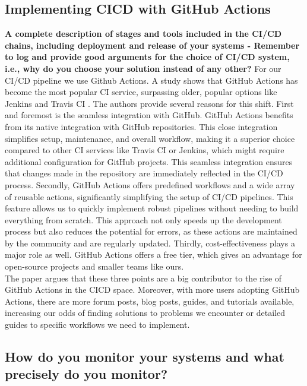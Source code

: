 \documentclass[11pt]{article}
\begin{document}
\subsection{Implementing CI\/CD with GitHub Actions}
\textbf{A complete description of stages and tools included in the CI/CD chains, including deployment and release of your systems - Remember to log and provide good arguments for the choice of CI/CD system, i.e., why do you choose your solution instead of any other?}
For our CI/CD pipeline we use Github Actions. A study shows that GitHub Actions has become the most popular CI service, surpassing older, popular options like Jenkins and Travis CI \citep{github_actions_good}. The authors provide several reasons for this shift. First and foremost is the seamless integration with GitHub. GitHub Actions benefits from its native integration with GitHub repositories. This close integration simplifies setup, maintenance, and overall workflow, making it a superior choice compared to other CI services like Travis CI or Jenkins, which might require additional configuration for GitHub projects. This seamless integration ensures that changes made in the repository are immediately reflected in the CI/CD process. 
Secondly, GitHub Actions offers predefined workflows and a wide array of reusable actions, significantly simplifying the setup of CI/CD pipelines. This feature allows us to quickly implement robust pipelines without needing to build everything from scratch. This approach not only speeds up the development process but also reduces the potential for errors, as these actions are maintained by the community and are regularly updated.
Thirdly, cost-effectiveness plays a major role as well. GitHub Actions offers a free tier, which gives an advantage for open-source projects and smaller teams like ours. \\
The paper argues that these three points are a big contributor to the rise of GitHub Actions in the CI\/CD space. Moreover, with more users adopting GitHub Actions, there are more forum posts, blog posts, guides, and tutorials available, increasing our odds of finding solutions to problems we encounter or detailed guides to specific workflows we need to implement. 



\subsection{How do you monitor your systems and what precisely do you monitor?}
\end{document}
